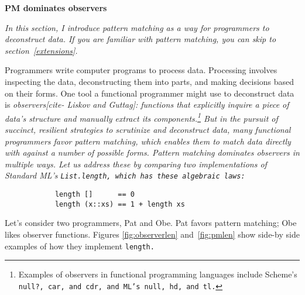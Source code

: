 \documentclass[manuscript,screen,review, 12pt]{acmart}
\begin{document}
    \begin{outline}[enumerate]
    \1 \bf{PM dominates observers} 

    \it{In this section, I introduce pattern matching as a way for programmers
    to deconstruct data. If you are familiar with pattern matching, you can skip
    to section~\ref{extensions}.}
    
    Programmers write computer programs to process data. Processing involves
    inspecting the data, deconstructing them into parts, and making decisions
    based on their forms. One tool a functional programmer might use to
    deconstruct data is \it{observers}[cite- Liskov and Guttag]: functions that
    explicitly inquire a piece of data's structure and manually extract its
    components.\footnote {Examples of observers in functional programming
    languages include Scheme's \tt{null?}, \tt{car}, and \tt{cdr}, and ML's
    \tt{null}, \tt{hd}, and \tt{tl}.} But in the pursuit of succinct, resilient
    strategies to scrutinize and deconstruct data, many functional programmers
    favor \it{pattern matching}, which enables them to match data directly with
    against a number of possible forms. Pattern matching dominates observers in
    multiple ways. Let us address these by comparing two implementations of
    Standard ML's \tt{List.length}, which has these algebraic laws: 

    \begin{minipage}[t]{\textwidth}
        \begin{verbatim}
            length []      == 0
            length (x::xs) == 1 + length xs 
        \end{verbatim}
    \end{minipage}
    
    Let's consider two programmers, Pat and Obe. Pat favors pattern matching;
    Obe likes observer functions. Figures \ref{fig:observerlen}
    and~\ref{fig:pmlen} show side-by side examples of how they implement
    \tt{length}. 


\end{outline}
\end{document}
